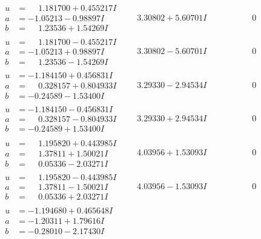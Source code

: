 \documentclass[1p]{elsarticle_modified}
\theoremstyle{definition}
\begin{document}
$$\begin{array}{c|c|c}
\begin{aligned}
u &= \phantom{-}1.181700 + 0.455217 I \\
a &= -1.05213 - 0.98897 I \\
b &= \phantom{-}1.23536 + 1.54269 I\end{aligned}
 & \phantom{-}3.30802 + 5.60701 I & \phantom{-0.000000 } 0 \\ \hline\begin{aligned}
u &= \phantom{-}1.181700 - 0.455217 I \\
a &= -1.05213 + 0.98897 I \\
b &= \phantom{-}1.23536 - 1.54269 I\end{aligned}
 & \phantom{-}3.30802 - 5.60701 I & \phantom{-0.000000 } 0 \\ \hline\begin{aligned}
u &= -1.184150 + 0.456831 I \\
a &= \phantom{-}0.328157 + 0.804933 I \\
b &= -0.24589 - 1.53400 I\end{aligned}
 & \phantom{-}3.29330 - 2.94534 I & \phantom{-0.000000 } 0 \\ \hline\begin{aligned}
u &= -1.184150 - 0.456831 I \\
a &= \phantom{-}0.328157 - 0.804933 I \\
b &= -0.24589 + 1.53400 I\end{aligned}
 & \phantom{-}3.29330 + 2.94534 I & \phantom{-0.000000 } 0 \\ \hline\begin{aligned}
u &= \phantom{-}1.195820 + 0.443985 I \\
a &= \phantom{-}1.37811 + 1.50021 I \\
b &= \phantom{-}0.05336 - 2.03271 I\end{aligned}
 & \phantom{-}4.03956 + 1.53093 I & \phantom{-0.000000 } 0 \\ \hline\begin{aligned}
u &= \phantom{-}1.195820 - 0.443985 I \\
a &= \phantom{-}1.37811 - 1.50021 I \\
b &= \phantom{-}0.05336 + 2.03271 I\end{aligned}
 & \phantom{-}4.03956 - 1.53093 I & \phantom{-0.000000 } 0 \\ \hline\begin{aligned}
u &= -1.194680 + 0.465648 I \\
a &= -1.20311 + 1.79616 I \\
b &= -0.28010 - 2.17430 I\end{aligned}

\end{array}$$
\end{document}
